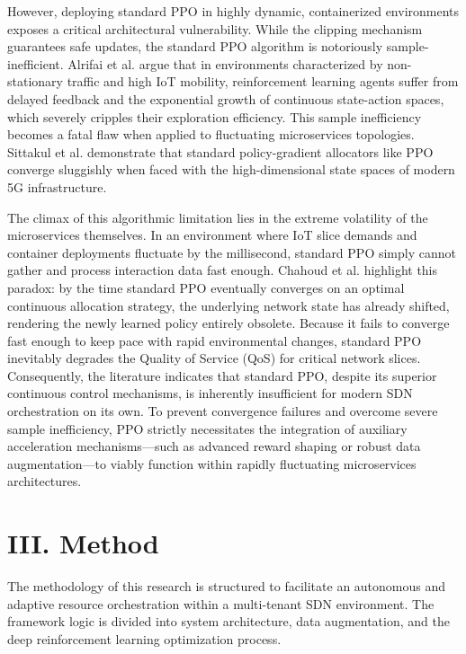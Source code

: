 However, deploying standard PPO in highly dynamic, containerized environments exposes a critical architectural vulnerability. While the clipping mechanism guarantees safe updates, the standard PPO algorithm is notoriously sample-inefficient\cite{b18}. Alrifai et al. argue that in environments characterized by non-stationary traffic and high IoT mobility, reinforcement learning agents suffer from delayed feedback and the exponential growth of continuous state-action spaces, which severely cripples their exploration efficiency\cite{b14}. This sample inefficiency becomes a fatal flaw when applied to fluctuating microservices topologies. Sittakul et al. demonstrate that standard policy-gradient allocators like PPO converge sluggishly when faced with the high-dimensional state spaces of modern 5G infrastructure\cite{b16}.

The climax of this algorithmic limitation lies in the extreme volatility of the microservices themselves. In an environment where IoT slice demands and container deployments fluctuate by the millisecond, standard PPO simply cannot gather and process interaction data fast enough. Chahoud et al. highlight this paradox: by the time standard PPO eventually converges on an optimal continuous allocation strategy, the underlying network state has already shifted, rendering the newly learned policy entirely obsolete\cite{b18}. Because it fails to converge fast enough to keep pace with rapid environmental changes, standard PPO inevitably degrades the Quality of Service (QoS) for critical network slices. Consequently, the literature indicates that standard PPO, despite its superior continuous control mechanisms, is inherently insufficient for modern SDN orchestration on its own. To prevent convergence failures and overcome severe sample inefficiency, PPO strictly necessitates the integration of auxiliary acceleration mechanisms---such as advanced reward shaping or robust data augmentation---to viably function within rapidly fluctuating microservices architectures\cite{b18}.

\section{III. Method}\label{iii.-method}

The methodology of this research is structured to facilitate an autonomous and adaptive resource orchestration within a multi-tenant SDN environment. The framework logic is divided into system architecture, data augmentation, and the deep reinforcement learning optimization process.

